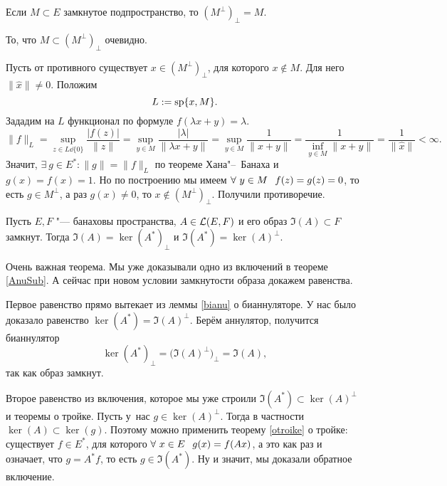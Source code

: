 \begin{Lem}[о бианнуляторе]\label{bianu}
  Если $M\subset E$ замкнутое подпространство, то $(M^\perp)_\perp = M$. 
\end{Lem}
\begin{Proof}
  То, что $M\subset (M^\perp)_\perp$ очевидно.

Пусть от противного существует $x\in (M^\perp)_\perp$, для которого $x\not\in M$. Для него $\|\hat x\|\ne0$. Положим
\[
  L:=\sp\{x,M\}.
\]
Зададим на $L$ функционал по формуле $f(\lambda x + y) = \lambda$.
\[
  \|f\|_L = \sup\limits_{z\in L\dd \{0\}}\frac{\big|f(z)\big|}{\|z\|} =
  \sup\limits_{y\in M}\frac{|\lambda|}{\|\lambda x + y\|} = 
  \sup\limits_{y\in M}\frac1{\|x+y\|} = 
  \frac1{\inf\limits_{y\in M}\|x+y\|} = \frac1{\|\hat x\|}<\infty.
\]
Значит, $\exists\ g\in E^*\colon \|g\| = \|f\|_L$ по теореме Хана"--~Банаха и $g(x) = f(x) = 1$. Но по построению мы имеем $\forall\ y\in M\pau f(z)=g(z)=0$, то есть $g\in M^\perp$, а раз $g(x)\ne 0$, то $x\not\in (M^\perp)_\perp$. Получили противоречие.
\end{Proof}
\begin{The}\label{AnuEq}
  Пусть $E,F$ "--- банаховы пространства, $A\in\L(E,F)$ и его образ $\Im(A)\subset F$ замкнут. Тогда $\Im(A) = \ker(A^*)_\perp$ и $\Im(A^*) = \ker(A)^\perp$.
\end{The}
Очень важная теорема. Мы уже доказывали одно из включений в теореме \ref{AnuSub}. А сейчас при новом условии замкнутости образа докажем равенства.
\begin{Proof}
  Первое равенство прямо вытекает из леммы \ref{bianu} о бианнуляторе. У нас было доказало равенство $\ker(A^*) = \Im(A)^\perp$. Берём аннулятор, получится бианнулятор
\[
  \ker(A^*)_\perp = \big(\Im(A)^\perp\big)_\perp = \Im(A),
\]
так как образ замкнут.

Второе равенство из включения, которое мы уже строили $\Im(A^*)\subset \ker(A)^\perp$ и теоремы о тройке. Пусть у~нас $g\in \ker(A)^\perp$. Тогда в частности $\ker(A)\subset \ker(g)$. Поэтому можно применить теорему \ref{otroike} о тройке: существует $f\in E^*$, для которого $\forall\ x\in E\pau g(x) = f(Ax)$, а это как раз и означает, что $g = A^*f$, то есть $g\in \Im(A^*)$. Ну и значит, мы доказали обратное включение.
\end{Proof}

